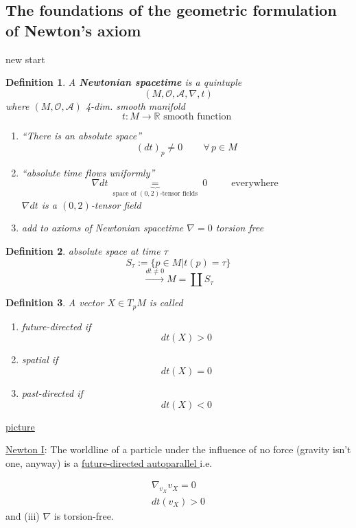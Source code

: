 \documentclass[10pt, twoside]{amsart}
\newtheorem{definition}{Definition}
\begin{document}
\begin{multicols*}{2}
\subsection{The foundations of the geometric formulation of Newton's axiom}

new start
\begin{definition}
A \textbf{Newtonian spacetime} is a quintuple \[
(M , \mathcal{O}, \mathcal{A}, \nabla , t)
\]
where $(M,\mathcal{O}, \mathcal{A})$ 4-dim. smooth manifold
\[
t: M \to \mathbb{R} \text{ smooth function }
\]

\begin{enumerate}
  \item[(i)] ``There is an absolute space''
\[
(dt)_p \neq 0 \quad \quad \, \forall \, p \in M 
\]
    \item[(ii)] ``absolute time flows uniformly''
\[
\nabla dt \underbrace{=}_{ \text{ space of $(0,2)$-tensor fields } }  0 \quad \quad \, \text{ everywhere }
\]
$\nabla dt $ is a $(0,2)$-tensor field
\item[(iii)] add to axioms of Newtonian spacetime 
$\nabla = 0$ torsion free
\end{enumerate}
\end{definition}

\begin{definition}
  absolute space at time $\tau$ 
\[
S_{\tau} := \lbrace p\in M | t(p) = \tau \rbrace
\]
\[
\xrightarrow{ dt \neq 0 } M = \coprod S_{\tau}
\]
\end{definition}

\begin{definition} A vector $X \in T_p M$ is called 
\begin{enumerate}
\item[(a)] future-directed if 
\[
dt(X) > 0 
\]
\item[(b)] spatial if 
\[
dt(X) = 0 
\]
\item[(c)]
past-directed if 
\[
dt(X) < 0
\]
\end{enumerate}
\end{definition}

\underline{picture}

\underline{Newton I}: The worldline of a particle under the influence of no force (gravity isn't one, anyway) is a \underline{future-directed autoparallel } i.e.

\[
\begin{gathered}
  \nabla_{v_{X}} v_{X} = 0 \\
  dt(v_{X}) > 0 
\end{gathered}
\]
and
(iii) $\nabla$ is torsion-free.


\end{multicols*}
\end{document}
